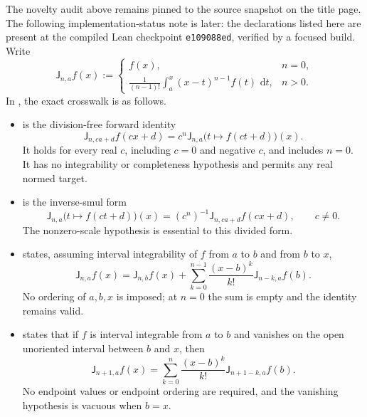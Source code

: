 \documentclass[11pt,oneside]{article}
\numberwithin{equation}{section}
\theoremstyle{definition}
\theoremstyle{remark}
\newcommand{\dd}{\,\mathrm d}
\begin{document}
The novelty audit above remains pinned to the source snapshot on the title page.  The
following implementation-status note is later: the declarations listed here are present at
the compiled Lean checkpoint \texttt{e109088ed}, verified by a focused build.  Write
\begin{equation}
 \mathsf J_{n,a}f(x):=
 \begin{cases}
 f(x),&n=0,\\[1mm]
 \displaystyle\frac1{(n-1)!}\int_a^x(x-t)^{n-1}f(t)\,\dd t,&n>0.
 \end{cases}                                                \label{eq:lean-volterra-crosswalk}
\end{equation}
In , the exact crosswalk is as follows.
\begin{itemize}
\item {} is the division-free forward identity
\begin{equation}
 \mathsf J_{n,ca+d}f(cx+d)
 =c^n\mathsf J_{n,a}\bigl(t\mapsto f(ct+d)\bigr)(x).          \label{eq:lean-affine-forward}
\end{equation}
It holds for every real $c$, including $c=0$ and negative $c$, and includes $n=0$.
It has no integrability or completeness hypothesis and permits any real normed target.
\item {} is the inverse-smul form
\begin{equation}
 \mathsf J_{n,a}\bigl(t\mapsto f(ct+d)\bigr)(x)
 =(c^n)^{-1}\mathsf J_{n,ca+d}f(cx+d),\qquad c\ne0.           \label{eq:lean-affine-inverse}
\end{equation}
The nonzero-scale hypothesis is essential to this divided form.
\item {} states, assuming interval integrability of
$f$ from $a$ to $b$ and from $b$ to $x$,
\begin{equation}
 \mathsf J_{n,a}f(x)=\mathsf J_{n,b}f(x)
 +\sum_{k=0}^{n-1}\frac{(x-b)^k}{k!}\mathsf J_{n-k,a}f(b).    \label{eq:lean-basepoint-shift}
\end{equation}
No ordering of $a,b,x$ is imposed; at $n=0$ the sum is empty and the identity remains
valid.
\item {} states that if $f$ is interval
integrable from $a$ to $b$ and vanishes on the open unoriented interval between $b$
and $x$, then
\begin{equation}
 \mathsf J_{n+1,a}f(x)
 =\sum_{k=0}^{n}\frac{(x-b)^k}{k!}\mathsf J_{n+1-k,a}f(b).    \label{eq:lean-zero-tail}
\end{equation}
No endpoint values or endpoint ordering are required, and the vanishing hypothesis is
vacuous when $b=x$.
\end{itemize}
\end{document}
